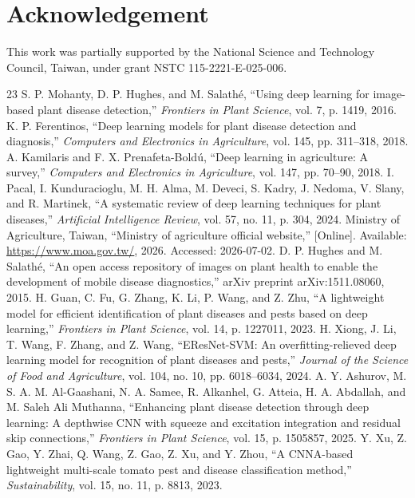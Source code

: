 \documentclass[10pt,twocolumn,a4paper]{article}
\begin{document}
\section*{Acknowledgement}
This work was partially supported by the National Science and Technology Council, Taiwan, under grant NSTC 115-2221-E-025-006.

{\small
\begin{thebibliography}{23}
 S. P. Mohanty, D. P. Hughes, and M. Salathé, “Using deep learning for image-based plant disease detection,” \textit{Frontiers in Plant Science}, vol. 7, p. 1419, 2016.
 K. P. Ferentinos, “Deep learning models for plant disease detection and diagnosis,” \textit{Computers and Electronics in Agriculture}, vol. 145, pp. 311–318, 2018.
 A. Kamilaris and F. X. Prenafeta-Boldú, “Deep learning in agriculture: A survey,” \textit{Computers and Electronics in Agriculture}, vol. 147, pp. 70–90, 2018.
 I. Pacal, I. Kunduracioglu, M. H. Alma, M. Deveci, S. Kadry, J. Nedoma, V. Slany, and R. Martinek, “A systematic review of deep learning techniques for plant diseases,” \textit{Artificial Intelligence Review}, vol. 57, no. 11, p. 304, 2024.
 Ministry of Agriculture, Taiwan, “Ministry of agriculture official website,” [Online]. Available: \url{https://www.moa.gov.tw/}, 2026. Accessed: 2026-07-02.
 D. P. Hughes and M. Salathé, “An open access repository of images on plant health to enable the development of mobile disease diagnostics,” arXiv preprint arXiv:1511.08060, 2015.
 H. Guan, C. Fu, G. Zhang, K. Li, P. Wang, and Z. Zhu, “A lightweight model for efficient identification of plant diseases and pests based on deep learning,” \textit{Frontiers in Plant Science}, vol. 14, p. 1227011, 2023.
 H. Xiong, J. Li, T. Wang, F. Zhang, and Z. Wang, “EResNet-SVM: An overfitting-relieved deep learning model for recognition of plant diseases and pests,” \textit{Journal of the Science of Food and Agriculture}, vol. 104, no. 10, pp. 6018–6034, 2024.
 A. Y. Ashurov, M. S. A. M. Al-Gaashani, N. A. Samee, R. Alkanhel, G. Atteia, H. A. Abdallah, and M. Saleh Ali Muthanna, “Enhancing plant disease detection through deep learning: A depthwise CNN with squeeze and excitation integration and residual skip connections,” \textit{Frontiers in Plant Science}, vol. 15, p. 1505857, 2025.
 Y. Xu, Z. Gao, Y. Zhai, Q. Wang, Z. Gao, Z. Xu, and Y. Zhou, “A CNNA-based lightweight multi-scale tomato pest and disease classification method,” \textit{Sustainability}, vol. 15, no. 11, p. 8813, 2023.

\end{thebibliography}}
\end{document}

